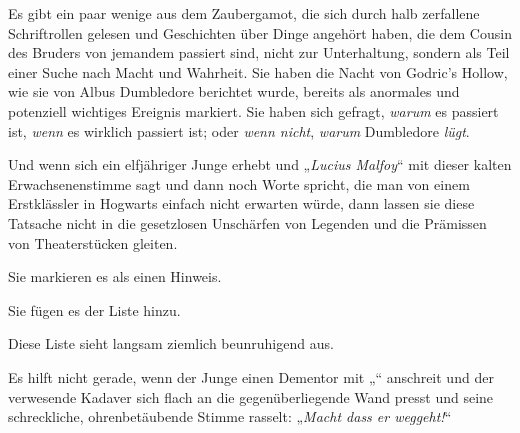 Es gibt ein paar wenige aus dem Zaubergamot, die sich durch halb zerfallene Schriftrollen gelesen und Geschichten über Dinge angehört haben, die dem Cousin des Bruders von jemandem passiert sind, nicht zur Unterhaltung, sondern als Teil einer Suche nach Macht und Wahrheit.
Sie haben die Nacht von Godric’s Hollow, wie sie von Albus Dumbledore berichtet wurde, bereits als anormales und potenziell wichtiges Ereignis markiert.
Sie haben sich gefragt, \emph{warum} es passiert ist, \emph{wenn} es wirklich passiert ist; oder \emph{wenn nicht}, \emph{warum} Dumbledore \emph{lügt}.

Und wenn sich ein elfjähriger Junge erhebt und „\emph{Lucius Malfoy}“ mit dieser kalten Erwachsenenstimme sagt und dann noch Worte spricht, die man von einem Erstklässler in Hogwarts einfach nicht erwarten würde, dann lassen sie diese Tatsache nicht in die gesetzlosen Unschärfen von Legenden und die Prämissen von Theaterstücken gleiten.

Sie markieren es als einen Hinweis.

Sie fügen es der Liste hinzu.

Diese Liste sieht langsam ziemlich beunruhigend aus.

Es hilft nicht gerade, wenn der Junge einen Dementor mit „“ anschreit und der verwesende Kadaver sich flach an die gegenüberliegende Wand presst und seine schreckliche, ohrenbetäubende Stimme rasselt: „\emph{Macht dass er weggeht!}“


